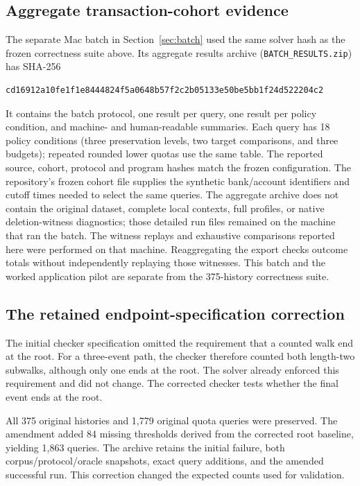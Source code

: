 \subsection{Aggregate transaction-cohort evidence}

The separate Mac batch in Section~\ref{sec:batch} used the same solver hash
as the frozen correctness suite above. Its aggregate results archive
(\texttt{BATCH\_RESULTS.zip}) has SHA-256
\begin{lstlisting}
cd16912a10fe1f1e8444824f5a0648b57f2c2b05133e50be5bb1f24d522204c2
\end{lstlisting}
It contains the batch protocol, one result per query, one result per policy
condition, and machine- and human-readable summaries. Each query has 18
policy conditions (three preservation levels, two target comparisons, and
three budgets); repeated rounded lower quotas use the same table. The
reported source, cohort, protocol and program hashes match the frozen
configuration. The repository's frozen cohort file supplies the synthetic
bank/account identifiers and cutoff times needed to select the same queries.
The aggregate archive does not contain the original dataset, complete local
contexts, full profiles, or native deletion-witness diagnostics; those detailed
run files remained on the machine that ran the batch. The witness replays
and exhaustive comparisons reported here were performed on that machine.
Reaggregating the export checks outcome totals without independently
replaying those witnesses. This batch and the worked application pilot are
separate from the 375-history correctness suite.

\subsection{The retained endpoint-specification correction}

The initial checker specification omitted the requirement that a counted walk
end at the root. For a three-event path, the checker therefore counted both
length-two subwalks, although only one ends at the root. The solver already
enforced this requirement and did not change. The corrected checker tests
whether the final event ends at the root.

All 375 original histories and 1,779 original quota queries were preserved.
The amendment added 84 missing thresholds derived from the corrected root
baseline, yielding 1,863 queries. The archive retains the initial failure,
both corpus/protocol/oracle snapshots, exact query additions, and the amended
successful run. This correction changed the expected counts used for validation.

